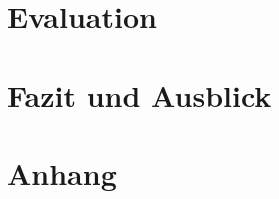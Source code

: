 \documentclass[12pt,a4paper,twoside,headsepline,parskip=half]{scrreprt}
\begin{document}
\label{sec:impl-grenzen}
\chapter{Evaluation}
\label{chap:evaluation}
\chapter{Fazit und Ausblick}

\printbibliography

\appendix
\chapter{Anhang}
\end{document}
